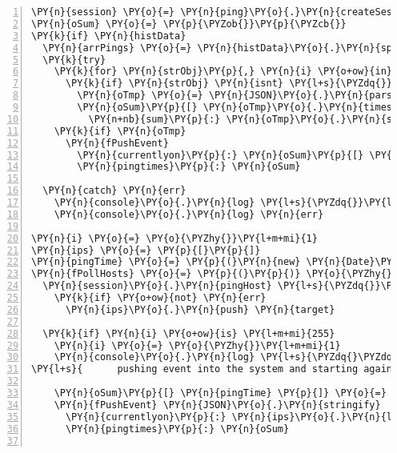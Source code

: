 \begin{Verbatim}[fontsize=\scriptsize,commandchars=\\\{\},numbers=left,firstnumber=1,stepnumber=1]
\PY{n}{session} \PY{o}{=} \PY{n}{ping}\PY{o}{.}\PY{n}{createSession} \PY{n}{retries}\PY{p}{:} \PY{l+m+mi}{2}
\PY{n}{oSum} \PY{o}{=} \PY{p}{\PYZob{}}\PY{p}{\PYZcb{}}
\PY{k}{if} \PY{n}{histData}
  \PY{n}{arrPings} \PY{o}{=} \PY{n}{histData}\PY{o}{.}\PY{n}{split} \PY{l+s}{\PYZdq{}}\PY{l+s+se}{\PYZbs{}n}\PY{l+s}{\PYZdq{}}
  \PY{k}{try}
    \PY{k}{for} \PY{n}{strObj}\PY{p}{,} \PY{n}{i} \PY{o+ow}{in} \PY{n}{arrPings}
      \PY{k}{if} \PY{n}{strObj} \PY{n}{isnt} \PY{l+s}{\PYZdq{}}\PY{l+s}{\PYZdq{}}
        \PY{n}{oTmp} \PY{o}{=} \PY{n}{JSON}\PY{o}{.}\PY{n}{parse} \PY{n}{strObj}  
        \PY{n}{oSum}\PY{p}{[} \PY{n}{oTmp}\PY{o}{.}\PY{n}{timestamp} \PY{p}{]} \PY{o}{=} 
          \PY{n+nb}{sum}\PY{p}{:} \PY{n}{oTmp}\PY{o}{.}\PY{n}{sum}
    \PY{k}{if} \PY{n}{oTmp}
      \PY{n}{fPushEvent}
        \PY{n}{currentlyon}\PY{p}{:} \PY{n}{oSum}\PY{p}{[} \PY{n}{oTmp}\PY{o}{.}\PY{n}{timestamp} \PY{p}{]}\PY{o}{.}\PY{n}{sum}
        \PY{n}{pingtimes}\PY{p}{:} \PY{n}{oSum}   

  \PY{n}{catch} \PY{n}{err}
    \PY{n}{console}\PY{o}{.}\PY{n}{log} \PY{l+s}{\PYZdq{}}\PY{l+s}{Error parsing histo data}\PY{l+s}{\PYZdq{}}
    \PY{n}{console}\PY{o}{.}\PY{n}{log} \PY{n}{err}

\PY{n}{i} \PY{o}{=} \PY{o}{\PYZhy{}}\PY{l+m+mi}{1}
\PY{n}{ips} \PY{o}{=} \PY{p}{[}\PY{p}{]}
\PY{n}{pingTime} \PY{o}{=} \PY{p}{(}\PY{n}{new} \PY{n}{Date}\PY{p}{(}\PY{p}{)}\PY{p}{)}\PY{o}{.}\PY{n}{toISOString}\PY{p}{(}\PY{p}{)}
\PY{n}{fPollHosts} \PY{o}{=} \PY{p}{(}\PY{p}{)} \PY{o}{\PYZhy{}}\PY{o}{\PYZgt{}}
  \PY{n}{session}\PY{o}{.}\PY{n}{pingHost} \PY{l+s}{\PYZdq{}}\PY{l+s}{192.168.1.\PYZsh{}\PYZob{} ++i \PYZcb{}}\PY{l+s}{\PYZdq{}}\PY{p}{,} \PY{p}{(} \PY{n}{err}\PY{p}{,} \PY{n}{target}\PY{p}{,} \PY{n}{sent}\PY{p}{,} \PY{n}{rcvd} \PY{p}{)} \PY{o}{\PYZhy{}}\PY{o}{\PYZgt{}}
    \PY{k}{if} \PY{o+ow}{not} \PY{n}{err}
      \PY{n}{ips}\PY{o}{.}\PY{n}{push} \PY{n}{target}
      
  \PY{k}{if} \PY{n}{i} \PY{o+ow}{is} \PY{l+m+mi}{255}
    \PY{n}{i} \PY{o}{=} \PY{o}{\PYZhy{}}\PY{l+m+mi}{1}
    \PY{n}{console}\PY{o}{.}\PY{n}{log} \PY{l+s}{\PYZdq{}\PYZdq{}\PYZdq{}}\PY{l+s}{\PYZsh{}\PYZob{} (new Date()).toISOString() \PYZcb{} | All ping requests returned (\PYZsh{}\PYZob{}ips.length\PYZcb{} answered),}
\PY{l+s}{      pushing event into the system and starting again at 0}\PY{l+s}{\PYZdq{}\PYZdq{}\PYZdq{}}
    
    \PY{n}{oSum}\PY{p}{[} \PY{n}{pingTime} \PY{p}{]} \PY{o}{=} \PY{n+nb}{sum}\PY{p}{:} \PY{n}{ips}\PY{o}{.}\PY{n}{length}
    \PY{n}{fPushEvent} \PY{n}{JSON}\PY{o}{.}\PY{n}{stringify}
      \PY{n}{currentlyon}\PY{p}{:} \PY{n}{ips}\PY{o}{.}\PY{n}{length}
      \PY{n}{pingtimes}\PY{p}{:} \PY{n}{oSum}


\end{Verbatim}
